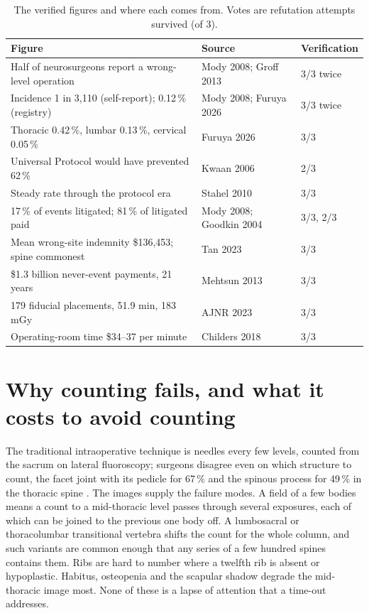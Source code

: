 \documentclass[11pt,letterpaper]{article}
\begin{document}
\begin{table}[htbp]\centering
\caption{The verified figures and where each comes from. Votes are refutation attempts survived (of 3).}
\small
\begin{tabular}{p{7.2cm}p{3.2cm}p{4.8cm}}
\toprule
Figure & Source & Verification \\
\midrule
Half of neurosurgeons report a wrong-level operation & Mody 2008; Groff 2013 & 3/3 twice \\
Incidence 1 in 3,110 (self-report); 0.12\,\% (registry) & Mody 2008; Furuya 2026 & 3/3 twice \\
Thoracic 0.42\,\%, lumbar 0.13\,\%, cervical 0.05\,\% & Furuya 2026 & 3/3 \\
Universal Protocol would have prevented 62\,\% & Kwaan 2006 & 2/3 \\
Steady rate through the protocol era & Stahel 2010 & 3/3 \\
17\,\% of events litigated; 81\,\% of litigated paid & Mody 2008; Goodkin 2004 & 3/3, 2/3 \\
Mean wrong-site indemnity \$136,453; spine commonest & Tan 2023 & 3/3 \\
\$1.3 billion never-event payments, 21 years & Mehtsun 2013 & 3/3 \\
179 fiducial placements, 51.9 min, 183 mGy & AJNR 2023 & 3/3 \\
Operating-room time \$34--37 per minute & Childers 2018 & 3/3 \\
\bottomrule
\end{tabular}
\end{table}

\section*{Why counting fails, and what it costs to avoid counting}
The traditional intraoperative technique is needles every few levels, counted from the sacrum on
lateral fluoroscopy; surgeons disagree even on which structure to count, the facet joint with its
pedicle for 67\,\% and the spinous process for 49\,\% in the thoracic spine \citep{strong2021,mayer2008}. The images supply the failure
modes. A field of a few bodies means a count to a mid-thoracic level passes through several
exposures, each of which can be joined to the previous one body off. A lumbosacral or thoracolumbar
transitional vertebra shifts the count for the whole column, and such variants are common enough that
any series of a few hundred spines contains them. Ribs are hard to number where a twelfth rib is absent
or hypoplastic. Habitus, osteopenia and the scapular shadow degrade the mid-thoracic image most. None of
these is a lapse of attention that a time-out addresses.
\end{document}
